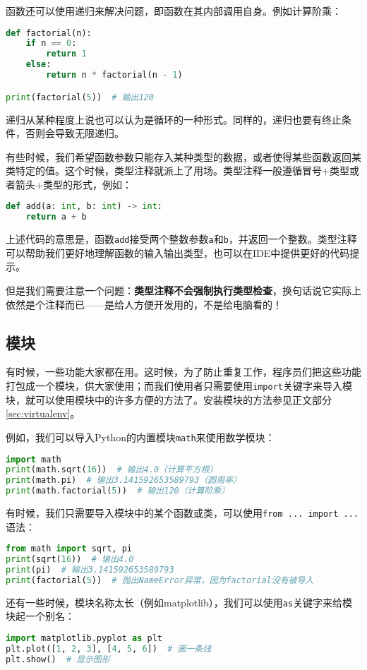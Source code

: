 \documentclass[../main.tex]{subfiles}
\begin{document}
函数还可以使用递归来解决问题，即函数在其内部调用自身。例如计算阶乘：
\begin{lstlisting}[language=python]
def factorial(n):
    if n == 0:
        return 1
    else:
        return n * factorial(n - 1)

print(factorial(5))  # 输出120
\end{lstlisting}

递归从某种程度上说也可以认为是循环的一种形式。同样的，递归也要有终止条件，否则会导致无限递归。

有些时候，我们希望函数参数只能存入某种类型的数据，或者使得某些函数返回某类特定的值。这个时候，类型注释就派上了用场。类型注释一般遵循冒号+类型或者箭头+类型的形式，例如：
\begin{lstlisting}[language=python]
def add(a: int, b: int) -> int:
    return a + b
\end{lstlisting}
上述代码的意思是，函数\texttt{add}接受两个整数参数\texttt{a}和\texttt{b}，并返回一个整数。类型注释可以帮助我们更好地理解函数的输入输出类型，也可以在IDE中提供更好的代码提示。

但是我们需要注意一个问题：\textbf{类型注释不会强制执行类型检查}，换句话说它实际上依然是个注释而已——是给人方便开发用的，不是给电脑看的！

\subsection{模块}
有时候，一些功能大家都在用。这时候，为了防止重复工作，程序员们把这些功能打包成一个模块，供大家使用；而我们使用者只需要使用\texttt{import}关键字来导入模块，就可以使用模块中的许多方便的方法了。安装模块的方法参见正文部分\ref{sec:virtualenv}。

例如，我们可以导入Python的内置模块\texttt{math}来使用数学模块：
\begin{lstlisting}[language=python]
import math
print(math.sqrt(16))  # 输出4.0（计算平方根）
print(math.pi)  # 输出3.141592653589793（圆周率）
print(math.factorial(5))  # 输出120（计算阶乘）
\end{lstlisting}

有时候，我们只需要导入模块中的某个函数或类，可以使用\texttt{from ... import ...}语法：
\begin{lstlisting}[language=python]
from math import sqrt, pi
print(sqrt(16))  # 输出4.0
print(pi)  # 输出3.141592653589793
print(factorial(5))  # 抛出NameError异常，因为factorial没有被导入
\end{lstlisting}

还有一些时候，模块名称太长（例如matplotlib），我们可以使用\texttt{as}关键字来给模块起一个别名：
\begin{lstlisting}[language=python]
import matplotlib.pyplot as plt
plt.plot([1, 2, 3], [4, 5, 6])  # 画一条线
plt.show()  # 显示图形
\end{lstlisting}
\end{document}
